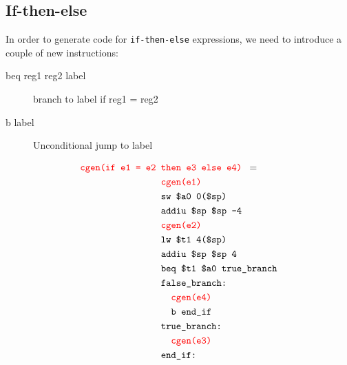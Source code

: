 \subsection{If-then-else}
In order to generate code for \texttt{if-then-else} expressions, we need to introduce a couple of new instructions:
\begin{description}
\item[beq reg1 reg2 label] branch to label if reg1 = reg2
\item[b label] Unconditional jump to label
\end{description}
\begin{align*}
\texttt{\color{red}cgen(if e1 = e2 }&\texttt{\color{red}then e3 else e4) }=\\
&\texttt{\color{red}cgen(e1)}\\
&\texttt{sw \$a0 0(\$sp)}\\
&\texttt{addiu \$sp \$sp -4}\\
&\texttt{\color{red}cgen(e2)}\\
&\texttt{lw \$t1 4(\$sp)}\\
&\texttt{addiu \$sp \$sp 4}\\
&\texttt{beq \$t1 \$a0 true\_branch}\\
&\texttt{false\_branch:}\\
&\texttt{\quad\color{red}cgen(e4)}\\
&\texttt{\quad b end\_if}\\
&\texttt{true\_branch:}\\
&\texttt{\quad\color{red}cgen(e3)}\\
&\texttt{end\_if:}
\end{align*}

